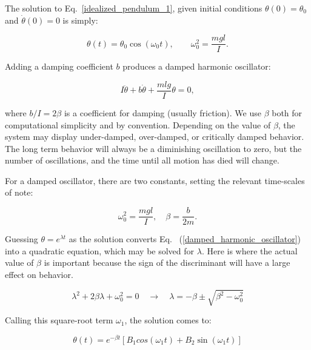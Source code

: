 \documentclass[12pt,twoside]{reedthesis}
\begin{document}
The solution to Eq.\ \ref{idealized_pendulum_1}, given initial conditions $\theta(0) = \theta_0$ and $\dot{\theta}(0) = 0$ is simply:

\begin{equation}
\label{SHO_soln_1}
\theta(t) = \theta_0 \cos{(\omega_0 t)}, \quad \quad \omega_0^2 = \frac{mgl}{I}.
\end{equation}

\noindent Adding a damping coefficient $b$ produces a damped harmonic oscillator: 

\begin{equation}
\label{damped_harmonic_oscillator}
I \ddot{\theta} +  b \dot{\theta} + \frac{mlg}{I}\theta = 0,
\end{equation}

\noindent where $b/I = 2 \beta$ is a coefficient for damping  (usually friction).  We use $\beta$ both for computational simplicity and by convention.  Depending on the value of $\beta$, the system may display under-damped, over-damped, or critically damped behavior.  The long term behavior will always be a diminishing oscillation to zero, but the number of oscillations, and the time until all motion has died will change.  

For a damped oscillator, there are two constants, setting the relevant time-scales of note: 

\begin{equation}
\label{dho_frequencies}
\omega_0^2 = \frac{mgl}{I}, \quad  \beta = \frac{b}{2 m}.
\end{equation}

Guessing $\theta = e^{\lambda t}$ as the solution converts Eq. ~(\ref{damped_harmonic_oscillator}) into a quadratic equation, which may be solved for $\lambda$.  Here is where the actual value of $\beta$ is important because the sign of the discriminant will have a large effect on behavior.  

\begin{equation}
\label{dho_discriminant}
\lambda^2 + 2 \beta \lambda + \omega_0^2 = 0 \quad \rightarrow \quad \lambda = -\beta \pm \sqrt{\beta^2 - \omega_0^2}
\end{equation}

Calling this square-root term $\omega_1$, the solution comes to:

\begin{equation}
\label{dho_solution}
\theta(t) = e^{- \beta t} [B_1 cos(\omega_1 t) + B_2 \sin(\omega_1 t)]
\end{equation}
\end{document}
